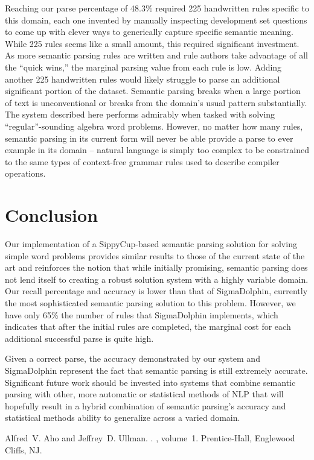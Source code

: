 \documentclass[11pt]{article}
\begin{document}
Reaching our parse percentage of 48.3\% required 225 handwritten rules specific to this domain, each one invented by manually inspecting development set questions to come up with clever ways to generically capture specific semantic meaning. While 225 rules seems like a small amount, this required significant investment. As more semantic parsing rules are written and rule authors take advantage of all the ``quick wins,'' the marginal parsing value from each rule is low. Adding another 225 handwritten rules would likely struggle to parse an additional significant portion of the dataset.
Semantic parsing breaks when a large portion of text is unconventional or breaks from the domain’s usual pattern substantially. The system described here performs admirably when tasked with solving ``regular''-sounding algebra word problems. However, no matter how many rules, semantic parsing in its current form will never be able provide a parse to ever example in its domain -- natural language is simply too complex to be constrained to the same types of context-free grammar rules used to describe compiler operations.


\section{Conclusion}
Our implementation of a SippyCup-based semantic parsing solution for solving simple word problems provides similar results to those of the current state of the art and reinforces the notion that while initially promising, semantic parsing does not lend itself to creating a robust solution system with a highly variable domain. Our recall percentage and accuracy is lower than that of SigmaDolphin, currently the most sophisticated semantic parsing solution to this problem. However, we have only 65\% the number of rules that SigmaDolphin implements, which indicates that after the initial rules are completed, the marginal cost for each additional successful parse is quite high.

Given a correct parse, the accuracy demonstrated by our system and SigmaDolphin represent the fact that semantic parsing is still extremely accurate. Significant future work should be invested into systems that combine semantic parsing with other, more automatic or statistical methods of NLP that will hopefully result in a hybrid combination of semantic parsing’s accuracy and statistical methods ability to generalize across a varied domain.

%
%
%
\begin{thebibliography}{}
Alfred~V. Aho and Jeffrey~D. Ullman.
.
, volume~1.
\newblock Prentice-{Hall}, Englewood Cliffs, NJ.
\end{thebibliography}
\end{document}
